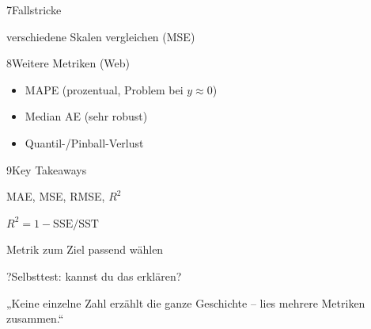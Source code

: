 \begin{hngrid}
\begin{hnp}[raster multicolumn=2,acc=hnred]{7}{Fallstricke}
\begin{hncon}
\item verschiedene Skalen vergleichen (MSE)
\end{hncon}
\end{hnp}
%
\begin{hnp}[raster multicolumn=2,acc=hngreen]{8}{Weitere Metriken (Web)}
\begin{itemize}
\item MAPE (prozentual, Problem bei $y{\approx}0$)
\item Median AE (sehr robust)
\item Quantil-/Pinball-Verlust
\end{itemize}
\end{hnp}
%
\begin{hnp}[raster multicolumn=2,acc=hnorange]{9}{Key Takeaways}
\begin{hnchk}
\item MAE, MSE, RMSE, $R^2$
\item $R^2=1-\mathrm{SSE}/\mathrm{SST}$
\item Metrik zum Ziel passend wählen
\end{hnchk}
\end{hnp}
%
\begin{hnp}[raster multicolumn=6,acc=hnpurple,colback=hnlilac!30]{?}{Selbsttest: kannst du das erklären?}
\end{hnp}
%
\begin{hnbanner}[raster multicolumn=6]
„Keine einzelne Zahl erzählt die ganze Geschichte -- lies mehrere Metriken zusammen.“
\end{hnbanner}
\end{hngrid}
